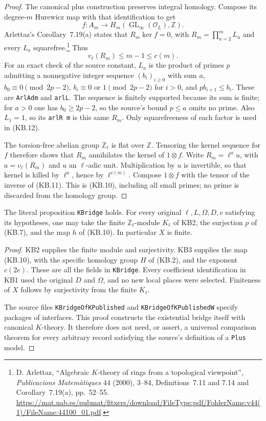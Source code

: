 \begin{proof}
The canonical plus construction preserves integral homology.
Compose its degree-$m$ Hurewicz map with that identification to get
\[
 f:A_m\longrightarrow
 H_m(\operatorname{GL}_\infty(\mathcal O_L),\mathbb Z).
\]
Arlettaz's Corollary~7.19(a) states that $R_m\ker f=0$, with
$R_m=\prod_{a=2}^m L_a$ and every $L_a$ squarefree.\footnote{
D. Arlettaz, ``Algebraic $K$-theory of rings from a topological
viewpoint'', \emph{Publicacions Matem\`atiques} 44 (2000), 3--84,
Definitions~7.11 and 7.14 and Corollary~7.19(a), pp.~52--55.
\url{https://mat.uab.es/pubmat/fitxers/download/FileType:pdf/FolderName:v44(1)/FileName:44100_01.pdf}.}
Thus
\[
                   v_\ell(R_m)\le m-1\le c(m).
 \tag{KB.12}
\]
For an exact check of the source constant, $L_a$ is the product of
primes $p$ admitting a nonnegative integer sequence $(b_i)_{i\ge0}$
with sum $a$, $b_0\equiv0\pmod{2p-2}$,
$b_i\equiv0\text{ or }1\pmod{2p-2}$ for $i>0$, and
$p b_{i+1}\le b_i$.  These are \texttt{ArlAdm} and \texttt{arlL}.
The sequence is finitely supported because its sum is finite;
for $a>0$ one has $b_0\ge2p-2$, so the source's bound $p\le a$
omits no prime.  Also $L_1=1$, so its \texttt{arlR m} is this
same $R_m$.  Only squarefreeness of each factor is used in (KB.12).

The torsion-free abelian group $\mathbb Z_\ell$ is flat over
$\mathbb Z$.  Tensoring the kernel sequence for $f$ therefore shows
that $R_m$ annihilates the kernel of $1\otimes f$.  Write
$R_m=\ell^a u$, with $a=v_\ell(R_m)$ and $u$ an $\ell$-adic unit.
Multiplication by $u$ is invertible, so that kernel is killed by
$\ell^a$, hence by $\ell^{c(m)}$.  Compose $1\otimes f$ with
the tensor of the inverse of (KB.11).  This is (KB.10), including
all small primes; no prime is discarded from the homology group.
\end{proof}

\begin{proposition}
\label{claim:KB4}
The literal proposition \texttt{KBridge} holds.
For every original $\ell,L,\Omega,D,e$ satisfying its hypotheses,
one may take the finite $\mathbb Z_\ell$-module $K_\ell$ of KB2,
the surjection $p$ of (KB.7), and the map $h$ of (KB.10).
In particular $X$ is finite.
\end{proposition}

\begin{proof}
KB2 supplies the finite module and surjectivity.  KB3 supplies the
map (KB.10), with the specific homology group $H$ of (KB.2),
and the exponent $c(2e)$.
These are all the fields in \texttt{KBridge}.  Every coefficient
identification in KB1 used the original $D$ and $\Omega$, and no
new local places were selected.  Finiteness of $X$ follows by
surjectivity from the finite $K_\ell$.

The source files \texttt{KBridgeOfKPublished} and
\texttt{KBridgeOfKPublishedW} specify packages of interfaces.
This proof constructs the existential bridge itself with canonical
$K$-theory.  It therefore does not need, or assert, a universal
comparison theorem for every arbitrary record satisfying the
source's definition of a \texttt{Plus} model.
\end{proof}

